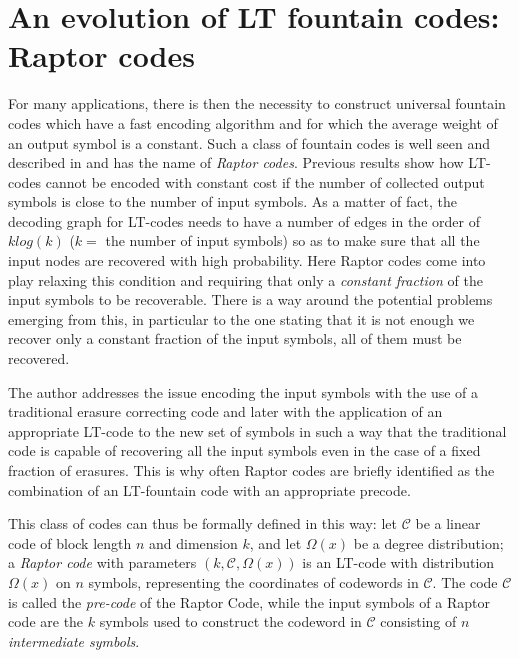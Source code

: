 \section{An evolution of LT fountain codes: Raptor codes}
For many applications, there is then the necessity to construct universal fountain codes which have a fast encoding algorithm and for which the average weight of an output symbol is a constant. Such a class of fountain codes is well seen and described in \cite{Shokrollahi2006} and has the name of \textit{Raptor codes}. Previous results show how LT-codes cannot be encoded with constant cost if the number of collected output symbols is close to the number of input symbols. As a matter of fact, the decoding graph for LT-codes needs to have a number of edges in the order of $klog(k)$ ($k =$ the number of input symbols) so as to make sure that all the input nodes are recovered with high probability. Here Raptor codes come into play relaxing this condition and requiring that only a \textit{constant fraction} of the input symbols to be recoverable. There is a way around the potential problems emerging from this, in particular to the one stating that it is not enough we recover only a constant fraction of the input symbols, all of them must be recovered.

The author addresses the issue encoding the input symbols with the use of a traditional erasure correcting code and later with the application of an appropriate LT-code to the new set of symbols in such a way that the traditional code is capable of recovering all the input symbols even in the case of a fixed fraction of erasures. This is why often Raptor codes are briefly identified as the combination of an LT-fountain code with an appropriate precode.

This class of codes can thus be formally defined in this way: let $\mathcal{C}$ be a linear code of block length $n$ and dimension $k$, and let $\Omega(x)$ be a degree distribution; a \textit{Raptor code} with parameters $(k,\mathcal{C},\Omega(x))$ is an LT-code with distribution $\Omega(x)$ on $n$ symbols, representing the coordinates of codewords in $\mathcal{C}$. The code $\mathcal{C}$ is called the \textit{pre-code} of the Raptor Code, while the input symbols of a Raptor code are the $k$ symbols used to construct the codeword in $\mathcal{C}$ consisting of $n$ \textit{intermediate symbols}.

